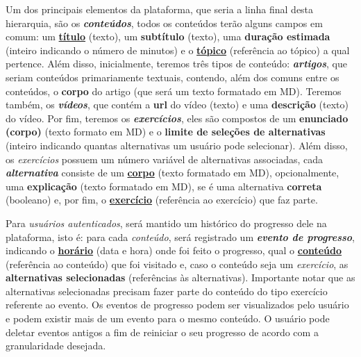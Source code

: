 
Um dos principais elementos da plataforma, que seria a linha final desta
hierarquia, são os \textbf{\textit{conteúdos}}, todos os conteúdos terão alguns
campos em comum: um \textbf{\underline{título}} (texto), um \textbf{subtítulo}
(texto), uma \textbf{duração estimada} (inteiro indicando o número de minutos)
e o \textbf{\underline{tópico}} (referência ao tópico) a qual pertence. Além
disso, inicialmente, teremos três tipos de conteúdo: \textbf{\textit{artigos}},
que seriam conteúdos primariamente textuais, contendo, além dos comuns entre os
conteúdos, o \textbf{corpo} do artigo (que será um texto formatado em MD).
Teremos também, os \textbf{\textit{vídeos}}, que contém a \textbf{url} do vídeo
(texto) e uma \textbf{descrição} (texto) do vídeo. Por fim, teremos os
\textbf{\textit{exercícios}}, eles são compostos de um \textbf{enunciado
  (corpo)} (texto formato em MD) e o \textbf{limite de seleções de alternativas}
(inteiro indicando quantas alternativas um usuário pode selecionar). Além
disso, os \textit{exercícios} possuem um número variável de alternativas
associadas, cada \textbf{\textit{alternativa}} consiste de um
\textbf{\underline{corpo}} (texto formatado em MD), opcionalmente, uma
\textbf{explicação} (texto formatado em MD), se é uma alternativa
\textbf{correta} (booleano) e, por fim, o \textbf{\underline{exercício}}
(referência ao exercício) que faz parte.


Para \textit{usuários autenticados}, será mantido um histórico do progresso
dele na plataforma, isto é: para cada \textit{conteúdo}, será registrado um
\textbf{\textit{evento de progresso}}, indicando o \textbf{\underline{horário}}
(data e hora) onde foi feito o progresso, qual o \textbf{\underline{conteúdo}}
(referência ao conteúdo) que foi visitado e, caso o conteúdo seja um
\textit{exercício}, as \textbf{alternativas selecionadas} (referências às
alternativas). Importante notar que as alternativas selecionadas precisam fazer
parte do conteúdo do tipo exercício referente ao evento. Os eventos de
progresso podem ser visualizados pelo usuário e podem existir mais de um evento
para o mesmo conteúdo. O usuário pode deletar eventos antigos a fim de
reiniciar o seu progresso de acordo com a granularidade desejada.


